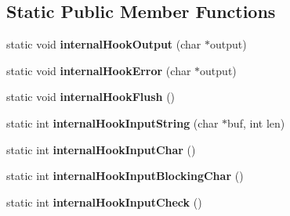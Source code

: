 \subsection*{Static Public Member Functions}
\begin{DoxyCompactItemize}
\item 
\hypertarget{class_g_a_u_s_s_ad907a936da9a60d342898b44bb37188c}{static void {\bfseries internal\-Hook\-Output} (char $\ast$output)}\label{class_g_a_u_s_s_ad907a936da9a60d342898b44bb37188c}

\item 
\hypertarget{class_g_a_u_s_s_addc2a30c69243f368be14bee3ada1761}{static void {\bfseries internal\-Hook\-Error} (char $\ast$output)}\label{class_g_a_u_s_s_addc2a30c69243f368be14bee3ada1761}

\item 
\hypertarget{class_g_a_u_s_s_a269ecd96318af60d348b650849d17c32}{static void {\bfseries internal\-Hook\-Flush} ()}\label{class_g_a_u_s_s_a269ecd96318af60d348b650849d17c32}

\item 
\hypertarget{class_g_a_u_s_s_ae9731be0762c7048f302be63c35827ce}{static int {\bfseries internal\-Hook\-Input\-String} (char $\ast$buf, int len)}\label{class_g_a_u_s_s_ae9731be0762c7048f302be63c35827ce}

\item 
\hypertarget{class_g_a_u_s_s_a67e47c77b2937d46ca7369d7244a86fd}{static int {\bfseries internal\-Hook\-Input\-Char} ()}\label{class_g_a_u_s_s_a67e47c77b2937d46ca7369d7244a86fd}

\item 
\hypertarget{class_g_a_u_s_s_abda34d5de755c678c5789d736480df17}{static int {\bfseries internal\-Hook\-Input\-Blocking\-Char} ()}\label{class_g_a_u_s_s_abda34d5de755c678c5789d736480df17}

\item 
\hypertarget{class_g_a_u_s_s_a24a9bde314967c81afed7a3cb150b94a}{static int {\bfseries internal\-Hook\-Input\-Check} ()}\label{class_g_a_u_s_s_a24a9bde314967c81afed7a3cb150b94a}

\end{DoxyCompactItemize}

